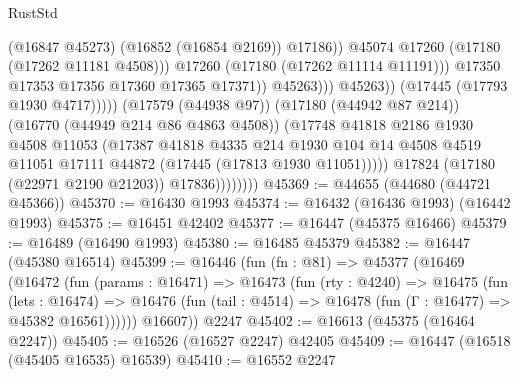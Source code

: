 \begin{lexlean}{RustStd}
\begin{coremodule}
{\begin{coremodule}
{{{{{{{{{{{{{{{{{{{{{{{{{{{{{{{{{{{{{{{{{{{{{{{{{{{{{{{                                                  (@16847 @45273)
                                                  (@16852 (@16854 @2169))
                                                  @17186))
                                              @45074
                                              @17260
                                              (@17180 (@17262 @11181 @4508)))
                                            @17260
                                            (@17180 (@17262 @11114 @11191)))
                                          @17350
                                          @17353
                                          @17356
                                          @17360
                                          @17365
                                          @17371))
                                      @45263)))
                                @45263))
                            (@17445 (@17793 @1930 @4717)))))
                      (@17579 (@44938 @97))
                      (@17180 (@44942 @87 @214))
                      (@16770 (@44949 @214 @86 @4863 @4508))
                      (@17748
                        @41818
                        @2186
                        @1930
                        @4508
                        @11053
                        (@17387
                          @41818
                          @4335
                          @214
                          @1930
                          @104
                          @14
                          @4508
                          @4519
                          @11051
                          @17111
                          @44872
                          (@17445 (@17813 @1930 @11051)))))
                    @17824
                    (@17180 (@22971 @2190 @21203))
                    @17836))))))))
@45369 := @44655 (@44680 (@44721 @45366))
@45370 := @16430 @1993
@45374 := @16432 (@16436 @1993) (@16442 @1993)
@45375 := @16451 @42402
@45377 := @16447 (@45375 @16466)
@45379 := @16489 (@16490 @1993)
@45380 := @16485 @45379
@45382 := @16447 (@45380 @16514)
@45399 := @16446
    (fun (fn : @81) =>
    @45377
      (@16469
        (@16472
          (fun (params : @16471) =>
          @16473
            (fun (rty : @4240) =>
            @16475
              (fun (lets : @16474) =>
              @16476 (fun (tail : @4514) => @16478 (fun (Γ : @16477) => @45382 @16561))))))
        @16607))
    @2247
@45402 := @16613 (@45375 (@16464 @2247))
@45405 := @16526 (@16527 @2247) @42405
@45409 := @16447 (@16518 (@45405 @16535) @16539)
@45410 := @16552 @2247
}}}}}}}}}}}}}}}}}}}}}}}}}}}}}}}}}}}}}}}}}}}}}}}}}}}}}}}
\end{coremodule}}
\end{coremodule}
\end{lexlean}
